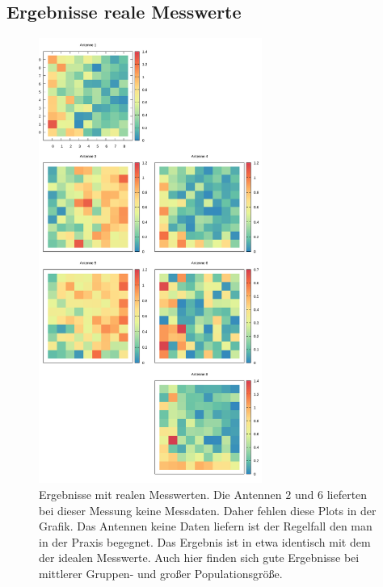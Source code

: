 \subsection{Ergebnisse reale Messwerte}
%
\begin{figure}[h!]
	\centering
	\caption[Ergebnis-Heatmap - Messwerte]{ Ergebnisse mit realen Messwerten. Die Antennen $2$ und $6$ lieferten bei dieser Messung keine Messdaten. Daher fehlen diese Plots in der Grafik. Das Antennen keine Daten liefern ist der Regelfall den man in der Praxis begegnet. Das Ergebnis ist in etwa identisch mit dem der idealen Messwerte. Auch hier finden sich gute Ergebnisse bei mittlerer Gruppen- und großer Populationsgröße.}
	\label{fig:results2}
	\includegraphics[width=0.65\textwidth]{img/resultRealData.png}
\end{figure}
%
